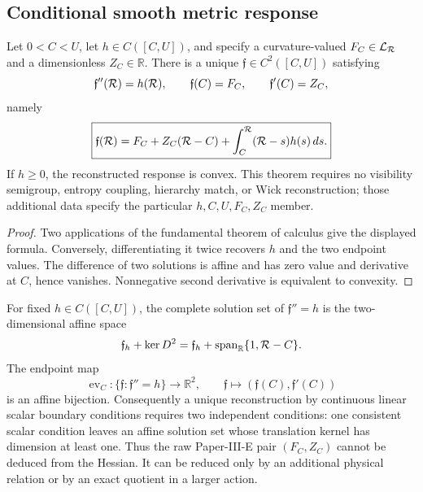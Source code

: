 \documentclass[12pt,a4paper]{article}
\begin{document}
\subsection{Conditional smooth metric response}

\begin{theorem}
\label{p3e:thm:general-hessian-reconstruction}
Let \(0<C<U\), let \(h\in C([C,U])\), and specify a curvature-valued
\(F_C\in\mathcal L_{\mathcal R}\) and a dimensionless \(Z_C\in\mathbb R\).
There is a unique
\(\mathfrak f\in C^2([C,U])\) satisfying
\[
 \mathfrak f''(\mathcal R)=h(\mathcal R),\qquad
 \mathfrak f(C)=F_C,\qquad
 \mathfrak f'(C)=Z_C,
\]
namely
\[
 \boxed{\mathfrak f(\mathcal R)
 =F_C+Z_C(\mathcal R-C)
 +\int_C^{\mathcal R}(\mathcal R-s)h(s)\,ds.}
\]
If \(h\ge0\), the reconstructed response is convex.  This theorem requires no
visibility semigroup, entropy coupling, hierarchy match, or Wick
reconstruction; those additional data specify the particular \(h,C,U,F_C,Z_C\) member.
\end{theorem}

\begin{proof}
Two applications of the fundamental theorem of calculus give the displayed
formula.  Conversely, differentiating it twice recovers \(h\) and the two
endpoint values.  The difference of two solutions is affine and has zero
value and derivative at \(C\), hence vanishes.  Nonnegative second derivative
is equivalent to convexity.
\end{proof}

\begin{corollary}
\label{p3e:cor:terminal-data-minimality}
For fixed \(h\in C([C,U])\), the complete solution set of
\(\mathfrak f''=h\) is the two-dimensional affine space
\[
 \mathfrak f_h+\ker D^2
 =\mathfrak f_h+\operatorname{span}_{\mathbb R}\{1,\mathcal R-C\}.
\]
The endpoint map
\[
 \operatorname{ev}_C:\{\mathfrak f:\mathfrak f''=h\}\longrightarrow
 \mathbb R^2,\qquad
 \mathfrak f\longmapsto(\mathfrak f(C),\mathfrak f'(C))
\]
is an affine bijection.  Consequently a unique reconstruction by continuous
linear scalar boundary conditions requires two independent conditions: one
consistent scalar condition leaves an affine solution set whose translation
kernel has dimension at least one.  Thus the raw
Paper-III-E pair \((F_C,Z_C)\) cannot be deduced from the Hessian.  It can be
reduced only by an additional physical relation or by an exact quotient in a
larger action.
\end{corollary}
\end{document}

